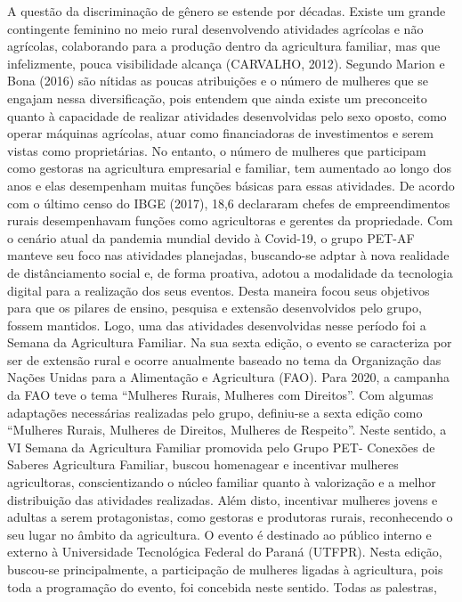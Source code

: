 A questão da discriminação de gênero se estende por décadas. Existe um grande 
contingente feminino no meio rural desenvolvendo atividades agrícolas e não agrícolas, 
colaborando para a produção dentro da agricultura familiar, mas que infelizmente, pouca 
visibilidade alcança (CARVALHO, 2012).
Segundo Marion e Bona (2016) são nítidas as poucas atribuições e o número de mulheres 
que se engajam nessa diversificação, pois entendem que ainda existe um preconceito quanto à 
capacidade de realizar atividades desenvolvidas pelo sexo oposto, como operar máquinas 
agrícolas, atuar como financiadoras de investimentos e serem vistas como proprietárias.
No entanto, o número de mulheres que participam como gestoras na agricultura empresarial 
e familiar, tem aumentado ao longo dos anos e elas desempenham muitas funções básicas para 
essas atividades. De acordo com o último censo do IBGE (2017), 18,6%
declararam chefes de empreendimentos rurais desempenhavam funções como agricultoras e 
gerentes da propriedade.
Com o cenário atual da pandemia mundial devido à Covid-19, o grupo PET-AF manteve 
seu foco nas atividades planejadas, buscando-se adptar à nova realidade de distânciamento social 
e, de forma proativa, adotou a modalidade da tecnologia digital para a realização dos seus eventos. 
Desta maneira focou seus objetivos para que os pilares de ensino, pesquisa e extensão 
desenvolvidos pelo grupo, fossem mantidos.
Logo, uma das atividades desenvolvidas nesse período foi a Semana da Agricultura 
Familiar. Na sua sexta edição, o evento se caracteriza por ser de extensão rural e ocorre 
anualmente baseado no tema da Organização das Nações Unidas para a Alimentação e Agricultura 
(FAO). Para 2020, a campanha da FAO teve o tema “Mulheres Rurais, Mulheres com Direitos”.
Com algumas adaptações necessárias realizadas pelo grupo, definiu-se a sexta edição como 
“Mulheres Rurais, Mulheres de Direitos, Mulheres de Respeito”.
Neste sentido, a VI Semana da Agricultura Familiar promovida pelo Grupo PET- Conexões 
de Saberes Agricultura Familiar, buscou homenagear e incentivar mulheres agricultoras, 
conscientizando o núcleo familiar quanto à valorização e a melhor distribuição das atividades 
realizadas. Além disto, incentivar mulheres jovens e adultas a serem protagonistas, como gestoras 
e produtoras rurais, reconhecendo o seu lugar no âmbito da agricultura.
O evento é destinado ao público interno e externo à Universidade Tecnológica Federal do 
Paraná (UTFPR). Nesta edição, buscou-se principalmente, a participação de mulheres ligadas à 
agricultura, pois toda a programação do evento, foi concebida neste sentido. Todas as palestras, 
